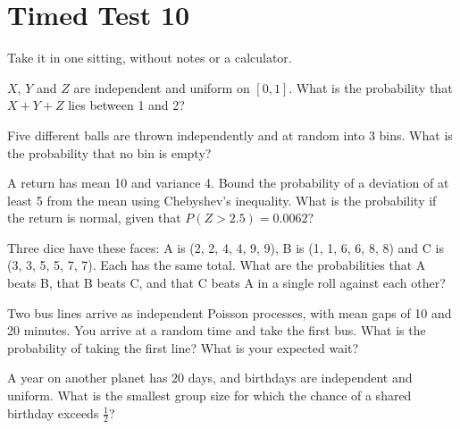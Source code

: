 \chapter{Timed Test 10}\label{ch:iv1:timed-test-10}

\begin{ivtrains}
Take it in one sitting, without notes or a calculator.
\end{ivtrains}


\begin{question}\label{iq:iv1:timed-test-10:1}
$X$, $Y$ and $Z$ are independent and uniform on $[0, 1]$. What is the probability that $X + Y + Z$ lies between 1 and 2?
\end{question}

\begin{question}\label{iq:iv1:timed-test-10:2}
Five different balls are thrown independently and at random into 3 bins. What is the probability that no bin is empty?
\end{question}

\begin{question}\label{iq:iv1:timed-test-10:3}
A return has mean 10 and variance 4. Bound the probability of a deviation of at least 5 from the mean using Chebyshev's inequality. What is the probability if the return is normal, given that $P(Z > 2.5) = 0.0062$?
\end{question}

\begin{question}\label{iq:iv1:timed-test-10:4}
Three dice have these faces: A is (2, 2, 4, 4, 9, 9), B is (1, 1, 6, 6, 8, 8) and C is (3, 3, 5, 5, 7, 7). Each has the same total. What are the probabilities that A beats B, that B beats C, and that C beats A in a single roll against each other?
\end{question}

\begin{question}\label{iq:iv1:timed-test-10:5}
Two bus lines arrive as independent Poisson processes, with mean gaps of 10 and 20 minutes. You arrive at a random time and take the first bus. What is the probability of taking the first line? What is your expected wait?
\end{question}

\begin{question}\label{iq:iv1:timed-test-10:6}
A year on another planet has 20 days, and birthdays are independent and uniform. What is the smallest group size for which the chance of a shared birthday exceeds $\frac12$?
\end{question}

